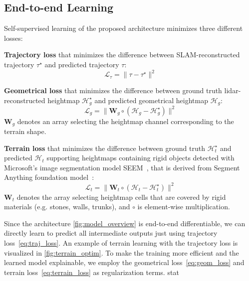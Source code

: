 \subsection{End-to-end Learning}\label{subsec:end2end_learning}
Self-supervised learning of the proposed architecture minimizes three different losses:

\textbf{Trajectory loss} that minimizes
the difference between SLAM-reconstructed trajectory $\tau^\star$ and predicted trajectory $\tau$:
\begin{equation}~\label{eq:traj_loss}
   \mathcal{L}_\tau = \|\tau-\tau^\star\|^2
\end{equation}

\textbf{Geometrical loss} that minimizes the difference between
ground truth lidar-reconstructed heightmap $\mathcal{H}_g^\star$
and predicted geometrical heightmap $\mathcal{H}_g$:
 \begin{equation}~\label{eq:geom_loss}
     \mathcal{L}_g = \|\mathbf{W}_g\circ(\mathcal{H}_g-\mathcal{H}_g^\star)\|^2
 \end{equation}
$\mathbf{W}_g$ denotes an array selecting the heightmap channel corresponding to the terrain shape.

\textbf{Terrain loss} that minimizes the difference between ground truth $\mathcal{H}_t^\star$
and predicted $\mathcal{H}_t$ supporting heightmaps containing rigid objects detected
with Microsoft's image segmentation model SEEM~\cite{zou2023segment},
that is derived from Segment Anything foundation model~\cite{li2023semantic}:
 \begin{equation}~\label{eq:terrain_loss}
     \mathcal{L}_t = \|\mathbf{W}_t\circ(\mathcal{H}_t-\mathcal{H}_t^\star)\|^2
 \end{equation}
$\mathbf{W}_t$ denotes the array selecting heightmap cells that are covered by rigid materials
(e.g. stones, walls, trunks), and $\circ$ is element-wise multiplication.

Since the architecture \autoref{fig:model_overview} is end-to-end differentiable,
we can directly learn to predict all intermediate outputs just using trajectory loss~\eqref{eq:traj_loss}.
An example of terrain learning with the trajectory loss is visualized in \autoref{fig:terrain_optim}.
To make the training more efficient and the learned model explainable, we employ the
geometrical loss~\eqref{eq:geom_loss} and terrain loss~\eqref{eq:terrain_loss} as regularization terms.
stat

